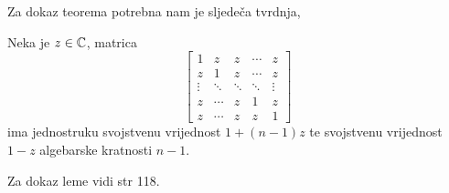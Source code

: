 \documentclass[a4paper,twoside,12pt]{memoir} %
\begin{document}
Za dokaz teorema potrebna nam je sljede\v{c}a tvrdnja,
\begin{lem}\label{lem:5:11}
    Neka je $z \in \mathbb{C}$, matrica 
    \begin{equation*}
        \begin{bmatrix*}
            1 & z & z & \cdots & z \\
            z & 1 & z & \cdots & z \\
            \vdots & \ddots & \ddots & \ddots & \vdots \\ 
            z & \cdots & z & 1 & z \\
            z & \cdots & z & z & 1 
        \end{bmatrix*}
    \end{equation*}
    ima jednostruku svojstvenu vrijednost $1+(n-1)z$ te svojstvenu vrijednost $1-z$ algebarske kratnosti $n-1$.
\end{lem}
\noindent Za dokaz leme vidi \cite{foucart13} str 118.
 
\end{document}

